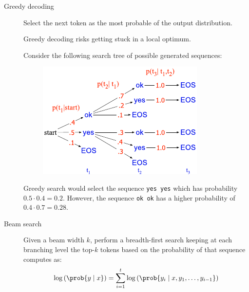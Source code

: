 \begin{description}
    \item[Greedy decoding] 
        Select the next token as the most probable of the output distribution.

        \begin{remark}
            Greedy decoding risks getting stuck in a local optimum.

            \indenttbox
            \begin{example}
                Consider the following search tree of possible generated sequences:

                \begin{minipage}{0.35\linewidth}
                    \begin{figure}[H]
                        \centering
                        \includegraphics[width=\linewidth]{./img/_greedy_decoding_local_minimum.pdf}
                    \end{figure}
                \end{minipage}
                \hfill
                \begin{minipage}[b]{0.6\linewidth}
                    Greedy search would select the sequence \texttt{yes yes} which has probability $0.5 \cdot 0.4 = 0.2$. However, the sequence \texttt{ok ok} has a higher probability of $0.4 \cdot 0.7 = 0.28$.
                \end{minipage}
            \end{example}
        \end{remark}

    \item[Beam search] 
        Given a beam width $k$, perform a breadth-first search keeping at each branching level the top-$k$ tokens based on the probability of that sequence computes as:
        \[ \log\left( \prob{y \mid x} \right) = \sum_{i=1}^{t} \log\left( \prob{ y_i \mid x, y_1, \dots, y_{i-1} } \right) \]


\end{description}

